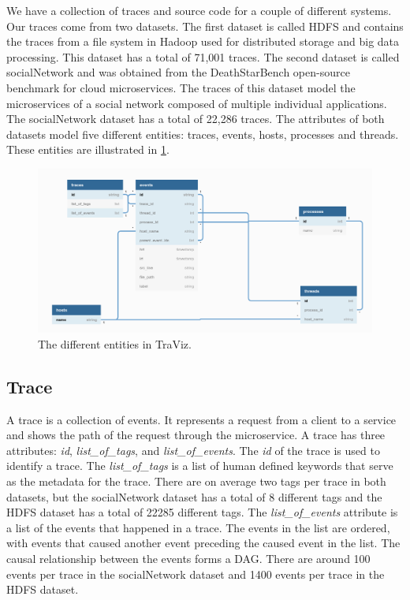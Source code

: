 \documentclass{article}
\begin{document}
We have a collection of traces and source code for a couple of different systems. Our traces come from two datasets.
The first dataset is called HDFS and contains the traces from a file system in Hadoop used for distributed storage 
and big data processing. This dataset has a total of 71,001 traces. The second dataset is called socialNetwork and
was obtained from the DeathStarBench open-source benchmark for cloud microservices. The traces of this dataset model
the microservices of a social network composed of multiple individual applications. The socialNetwork dataset has
a total of 22,286 traces. The attributes of both datasets model five different entities: traces, events, hosts,
processes and threads. These entities are illustrated in \ref{fig:entities}.

\begin{figure}
    \includegraphics[width=\linewidth]{../data_abstractions.png}
    \caption{The different entities in TraViz.}
    \label{fig:entities}
  \end{figure}

\subsection{Trace}

A trace is a collection of events. It represents a request from a client to a service and shows the path of the
request through the microservice. A trace has three attributes: \textit{id}, \textit{list\_of\_tags}, and \textit{list\_of\_events}.
The \textit{id} of the trace is used to identify a trace. The \textit{list\_of\_tags} is a list of human defined keywords that serve as
the metadata for the trace. There are on average two tags per trace in both datasets, but the socialNetwork
dataset has a total of 8 different tags and the HDFS dataset has a total of 22285 different tags. The
\textit{list\_of\_events} attribute is a list of the events that happened in a trace. The events in the list
are ordered, with events that caused another event preceding the caused event in the list. The causal relationship
between the events forms a DAG. There are around 100 events per trace in the socialNetwork dataset and 1400 events per trace
in the HDFS dataset.
\end{document}
